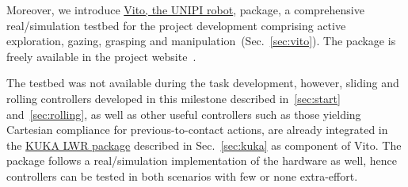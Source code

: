 \documentclass[a4paper,11pt,pdf]{pacmanreport}
\begin{document}






Moreover, we introduce \href{https://github.com/CentroEPiaggio/vito_robot}{Vito, the UNIPI robot}, package, a comprehensive real/simulation testbed for the project development comprising active exploration, gazing, grasping and manipulation~(Sec.~\ref{sec:vito}). The package is freely available in the project website~\cite{PACMAN_software}.

The testbed was not available during the task development, however, sliding and rolling controllers developed in this milestone described in~\ref{sec:start} and~\ref{sec:rolling}, as well as other useful controllers such as those yielding Cartesian compliance for previous-to-contact actions, are already integrated in the \href{https://github.com/CentroEPiaggio/kuka-lwr}{KUKA LWR package} described in Sec.~\ref{sec:kuka} as component of Vito. The package follows a real/simulation implementation of the hardware as well, hence controllers can be tested in both scenarios with few or none extra-effort.
\end{document}
